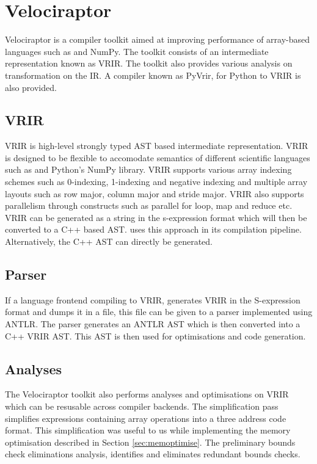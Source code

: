 \section{Velociraptor}
Velociraptor is a compiler toolkit aimed at improving performance of array-based languages such as \matlab and NumPy. The toolkit consists of an intermediate representation known as VRIR. The toolkit also provides various analysis on transformation on the IR. A compiler known as PyVrir, for Python to VRIR is also provided. 
\subsection{VRIR}
VRIR is high-level strongly typed AST based intermediate representation. VRIR is designed to be flexible to accomodate semantics of different scientific languages such as \matlab and Python's NumPy library. VRIR supports various array indexing schemes such as 0-indexing, 1-indexing and negative indexing and multiple array layouts such as row major, column major and stride major. VRIR also supports parallelism through constructs such as parallel for loop, map and reduce etc. VRIR can be generated as a string in the s-expression format which will then be converted to a C++ based AST. \velocty uses this approach in its compilation pipeline. Alternatively, the C++ AST can directly be generated.

\subsection{Parser}
If a language frontend compiling to VRIR, generates VRIR in the S-expression format and dumps it in a file, this file can be given to a parser implemented using ANTLR\cite{antlr}. The parser generates an ANTLR AST which is then converted into a C++ VRIR AST. This AST is then used for optimisations and code generation.  
\subsection{Analyses}
The Velociraptor toolkit also performs analyses and optimisations on VRIR which  can be resusable across compiler backends. The simplification pass simplifies expressions containing array operations into a three address code format. This simplification was useful to us while implementing the memory optimisation described in Section \ref{sec:memoptimise}. The preliminary bounds check eliminations analysis, identifies and eliminates redundant bounds checks.
